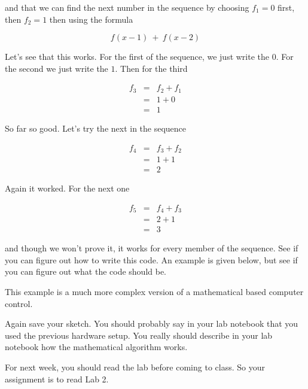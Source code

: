 and that we can find the next number in the sequence by choosing $f_{1}=0$
first, then $f_{2}=1$ then using the formula 

\begin{equation*}
	f(x-1)\ +\ f(x-2)
\end{equation*}

Let's see that this works. For the first of the sequence, we just write the $
0.$ For the second we just write the $1.$ Then for the third 

\begin{eqnarray*}
	f_{3} &=&f_{2}+f_{1} \\
	&=&1+0 \\
	&=&1
\end{eqnarray*}

So far so good. Let's try the next in the sequence

\begin{eqnarray*}
	f_{4} &=&f_{3}+f_{2} \\
	&=&1+1 \\
	&=&2
\end{eqnarray*}

Again it worked. For the next one

\begin{eqnarray*}
	f_{5} &=&f_{4}+f_{3} \\
	&=&2+1 \\
	&=&3
\end{eqnarray*}

and though we won't prove it, it works for every member of the sequence. See
if you can figure out how to write this code. An example is given below, but
see if you can figure out what the code should be.

This example is a much more complex version of a mathematical based computer
control.



Again save your sketch. You should probably say in your lab notebook that
you used the previous hardware setup. You really should describe in your lab
notebook how the mathematical algorithm works.

For next week, you should read the lab before coming to class. So your
assignment is to read Lab 2.

\vspace*{\fill}
\pagebreak
